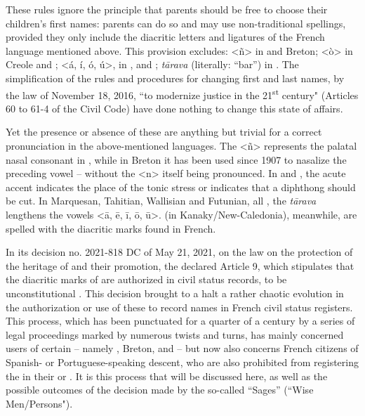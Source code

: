 \documentclass[output=paper,colorlinks,citecolor=brown]{langscibook}
\begin{document}
These rules ignore the principle that parents should be free to choose their children's first names: parents can do so and may use non-traditional spellings, provided they only include the diacritic letters and ligatures of the French language mentioned above. This provision excludes: <ñ> in  and Breton; <ò> in Creole and ; <á, í, ó, ú>, in ,  and ; \textit{tārava} (literally: ``bar”) in . The simplification of the rules and procedures for changing first and last names, by the law of November 18, 2016, ``to modernize justice in the 21\textsuperscript{st} century" (Articles 60 to 61-4 of the Civil Code) have done nothing to change this state of affairs. 

Yet the presence or absence of these  are anything but trivial for a correct pronunciation in the above-mentioned languages. The <ñ> represents the palatal nasal consonant in , while in Breton it has been used since 1907 to nasalize the preceding vowel – without the <n> itself being pronounced. In  and , the acute accent indicates the place of the tonic stress or indicates that a diphthong should be cut. In Marquesan, Tahitian, Wallisian and Futunian, all , the \textit{tārava} lengthens the vowels <ā, ē, ī, ō, ū>.  (in Kanaky/New-Caledonia), meanwhile, are spelled with the diacritic marks found in French.

In its decision no. 2021-818 DC of May 21, 2021, on the law on the protection of the heritage of  and their promotion, the  declared Article 9, which stipulates that the diacritic marks of  are authorized in civil status records, to be unconstitutional \citep{sm:ConseilConstitutionnel2021}. This decision brought to a halt a rather chaotic evolution in the authorization or use of these  to record names in French civil status registers. This process, which has been punctuated for a quarter of a century by a series of legal proceedings marked by numerous twists and turns, has mainly concerned users of certain  – namely , Breton,  and  – but now also concerns French citizens of Spanish- or Portuguese-speaking descent, who are also prohibited from registering the  in their  or . It is this process that will be discussed here, as well as the possible outcomes of the decision made by the so-called ``Sages” (``Wise Men/Persons").
\end{document}
